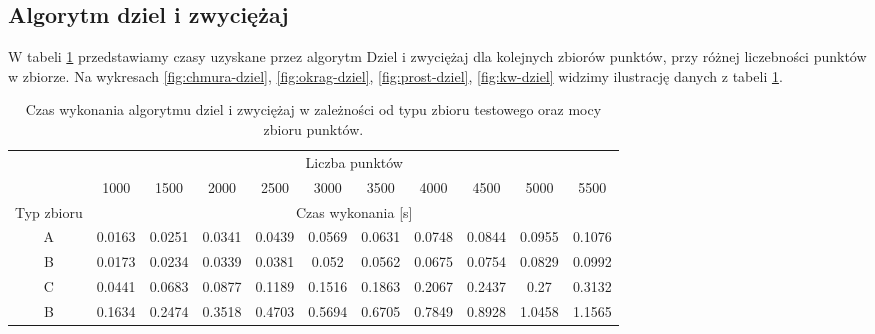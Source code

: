 \documentclass[11pt]{article}
\theoremstyle{remark} \newtheorem{definition}{def.}
\theoremstyle{definition} \newtheorem{twierdzenie}{tw.}
\begin{document}
\subsection{Algorytm dziel i zwyciężaj}

W tabeli \ref{tab:dziel} przedstawiamy czasy uzyskane przez algorytm Dziel i zwyciężaj dla kolejnych zbiorów punktów, przy różnej liczebności punktów w zbiorze. Na wykresach \ref{fig:chmura-dziel}, 
\ref{fig:okrag-dziel}, \ref{fig:prost-dziel}, \ref{fig:kw-dziel} widzimy ilustrację danych z tabeli \ref{tab:dziel}.

\begin{table}[]
\centering
\caption{Czas wykonania algorytmu dziel i zwyciężaj w zależności od typu zbioru testowego oraz mocy zbioru punktów.}
\label{tab:dziel}
\begin{tabular}{c|c|c|c|c|c|c|c|c|c|c|}
\cline{2-11}
\multicolumn{1}{l|}{} & \multicolumn{10}{c|}{Liczba punktów} \\ \cline{2-11} 
\multicolumn{1}{l|}{} & 1000 & 1500 & 2000 & 2500 & 3000 & 3500 & 4000 & 4500 & 5000 & 5500 \\ \hline
\multicolumn{1}{|c|}{Typ zbioru} & \multicolumn{10}{c|}{Czas wykonania {[}s{]}} \\ \hline
\multicolumn{1}{|c|}{A} & 0.0163 & 0.0251 & 0.0341 & 0.0439 & 0.0569 & 0.0631 & 0.0748 & 0.0844 & 0.0955 & 0.1076 \\ \hline
\multicolumn{1}{|c|}{B} & 0.0173 & 0.0234 & 0.0339 & 0.0381 & 0.052 & 0.0562 & 0.0675 & 0.0754 & 0.0829 & 0.0992 \\ \hline
\multicolumn{1}{|c|}{C} & 0.0441 & 0.0683 & 0.0877 & 0.1189 & 0.1516 & 0.1863 & 0.2067 & 0.2437 & 0.27 & 0.3132 \\ \hline
\multicolumn{1}{|c|}{B} & 0.1634 & 0.2474 & 0.3518 & 0.4703 & 0.5694 & 0.6705 & 0.7849 & 0.8928 & 1.0458 & 1.1565 \\ \hline
\end{tabular}
\end{table}
\end{document}
